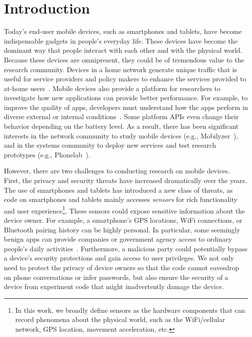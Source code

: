 \section{Introduction}

Today's end-user mobile devices, such as smartphones and
tablets, have become indispensable gadgets in people's everyday
life. These devices have become the dominant way that 
people interact with each other and with the physical world. Because 
these devices are omnipresent, they could be of tremendous value to 
the research community. Devices in a home network  
generate unique traffic that is useful for service providers and policy
makers to enhance the services provided to at-home 
users~\cite{sundaresan2011broadband}.
Mobile devices also provide a platform for researchers to
investigate how new applications can provide better performance.
For example, to improve the quality of apps, developers must 
understand how the apps perform in diverse external or internal
conditions~\cite{ravindranath2012appinsight}. Some platform
APIs even change their behavior depending on the battery level.
As a result, there has been significant interests in the network
community to study mobile devices
(e.g., Mobilyzer~\cite{nikravesh2015mobilyzer}), and in the
systems community to deploy new services and test research
prototypes (e.g., Phonelab~\cite{phonelab, nandugudi2013phonelab}).  
					
However, there are two challenges to conducting research
on mobile devices. First, the privacy and security threats
have increased dramatically over the years. The use of 
smartphones and tablets has introduced a new class of threats, 
as code on smartphones and tablets mainly accesses
\textit{sensors} for rich functionality and user experience\footnote{\scriptsize In 
this work, we broadly define sensors as the hardware components 
that can record phenomena about the physical world, such as the 
WiFi/cellular network, GPS location, movement acceleration, etc.}. 
These sensors could expose sensitive information about the device 
owner. For example, a smartphone's GPS locations,
WiFi connections, or Bluetooth pairing history can be highly
personal. In particular, some seemingly benign apps can provide 
companies or government agency access to ordinary 
people's daily activities~\cite{AngryBirds}. Furthermore, 
a malicious party could potentially bypass a
device's security protections and gain access to user
privileges. We not only need to  protect the privacy
of device owners so that the code cannot eavesdrop on phone
conversations or infer passwords, but also ensure the security of a device
from experiment code that might inadvertently damage 
the device.

